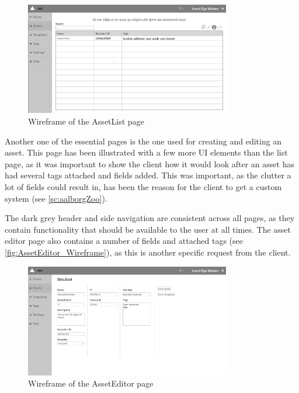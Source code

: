 \begin{figure}[H]
    \centering
    \includegraphics[width=0.8\textwidth]{figures/wireframes/AssetList_Wireframe.png}
    \caption{Wireframe of the AssetList page}
    \label{fig:AssetList_Wireframe}
\end{figure}

Another one of the essential pages is the one used for creating and editing an asset. This page has been illustrated with a few more UI elements than the list page, as it was important to show the client how it would look after an asset has had several tags attached and fields added.
This was important, as the clutter a lot of fields could result in, has been the reason for the client to get a custom system (see \autoref{sc:aalborgZoo}).
\par
The dark grey header and side navigation are consistent across all pages, as they contain functionality that should be available to the user at all times. The asset editor page also contains a number of fields and attached tags (see \autoref{fig:AssetEditor_Wireframe}), as this is another specific request from the client.

\begin{figure}[H]
    \centering
    \includegraphics[width=0.8\textwidth]{figures/wireframes/AssetEditor_Wireframe.png}
    \caption{Wireframe of the AssetEditor page}
    \label{fig:AssetEditor_Wireframe}
\end{figure}

